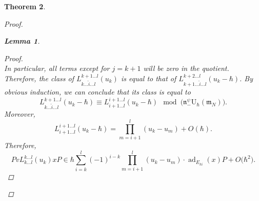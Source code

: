 \documentclass[10pt,a4paper]{article}
\numberwithin{equation}{section}
\newtheorem{Theorem}{Theorem}[section]
\newtheorem{Lemma}[Theorem]{Lemma}
\newcommand{\U}{\mathrm{U}_{\hbar}}
\newcommand{\n}{\mathfrak{n}}
\newcommand{\m}{\mathfrak{m}}
\DeclareMathOperator{\ad}{ad}
\begin{document}
\begin{Theorem}
\begin{proof}
\begin{Lemma}
\begin{proof}
\[					\]
					In particular, all terms except for $j=k+1$ will be zero in the quotient. Therefore, the class of $L_{k \dots \hat{i} \dots l}^{k+1 \dots l}(u_k)$ is equal to that of $L_{k+1\dots \hat{i} \dots l}^{k+2 \dots l}(u_k-\hbar)$. By obvious induction, we can conclude that its class is equal to
					\begin{equation}
						\label{eq::class_quot}
						L_{k \dots \hat{i} \dots l}^{k+1 \dots l}(u_k-\hbar) \equiv L_{i+1\dots l}^{i+1\dots l}(u_k-\hbar) \mod\bigl(\n_-^{\psi} \U(\m_N)\bigr).
					\end{equation}
					Moreover,
					\[
					L_{i+1\dots l}^{i+1\dots l}(u_k-\hbar) = \prod\limits_{m=i+1}^l (u_k - u_m) + O(\hbar).
					\]
					Therefore,
					\begin{equation}
						\label{eq::action_minor}
						Pv L_{k\dots l}^{k \dots l}(u_k) x P \in \hbar \sum\limits_{i=k}^l (-1)^{i-k} \prod_{m=i+1}^l (u_k - u_m) \cdot \ad_{E_{ki}}(x) P + O\bigl(\hbar^2\bigr).
					\end{equation}
					

\end{proof}
\end{Lemma}
\end{proof}
\end{Theorem}
\end{document}
